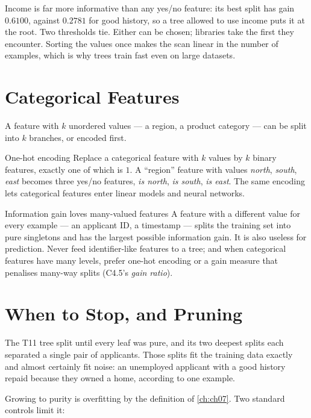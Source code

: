 Income is far more informative than any yes/no feature: its best split has gain
$0.6100$, against $0.2781$ for good history, so a tree allowed to use income puts
it at the root. Two thresholds tie. Either can be chosen; libraries take the
first they encounter. Sorting the values once makes the scan linear in the
number of examples, which is why trees train fast even on large datasets.

\section{Categorical Features}
\label{sec:categorical}

A feature with $k$ unordered values --- a region, a product category --- can be
split into $k$ branches, or encoded first.

\begin{defbox}{One-hot encoding}
Replace a categorical feature with $k$ values by $k$ binary features, exactly one
of which is $1$. A ``region'' feature with values \emph{north}, \emph{south},
\emph{east} becomes three yes/no features, \emph{is north}, \emph{is south},
\emph{is east}. The same encoding lets categorical features enter linear models
and neural networks.
\end{defbox}

\begin{pitfall}{Information gain loves many-valued features}
A feature with a different value for every example --- an applicant ID, a
timestamp --- splits the training set into pure singletons and has the largest
possible information gain. It is also useless for prediction. Never feed
identifier-like features to a tree; and when categorical features have many
levels, prefer one-hot encoding or a gain measure that penalises many-way splits
(C4.5's \emph{gain ratio}).
\end{pitfall}

\section{When to Stop, and Pruning}
\label{sec:stopping}

The T11 tree split until every leaf was pure, and its two deepest splits each
separated a single pair of applicants. Those splits fit the training data
exactly and almost certainly fit noise: an unemployed applicant with a good
history repaid because they owned a home, according to one example.

Growing to purity is overfitting by the definition of \cref{ch:ch07}. Two
standard controls limit it:

